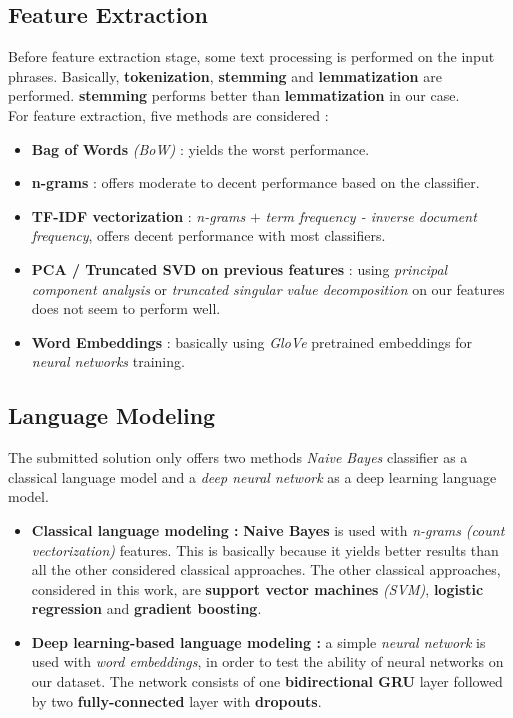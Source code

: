 \documentclass[letterpaper, 10 pt, conference]{ieeeconf}  %
\begin{document}
\subsection{Feature Extraction}
Before feature extraction stage, some text processing is performed on the input phrases. Basically, \textbf{tokenization}, \textbf{stemming} and \textbf{lemmatization} are performed. \textbf{stemming} performs better than \textbf{lemmatization} in our case. \\
For feature extraction, five methods are considered :
\begin{itemize}
    \item \textbf{Bag of Words} \emph{(BoW)} : yields the worst performance.
    \item \textbf{n-grams} : offers moderate to decent performance based on the classifier.
    \item \textbf{TF-IDF vectorization} : \emph{n-grams} $+$ \emph{term frequency - inverse document frequency}, offers decent performance with most classifiers.
    \item \textbf{PCA / Truncated SVD on previous features} : using \emph{principal component analysis} or \emph{truncated singular value decomposition} on our features does not seem to perform well.
    \item \textbf{Word Embeddings} : basically using \emph{GloVe} pretrained embeddings for \emph{neural networks} training.
\end{itemize}

\subsection{Language Modeling}
The submitted solution only offers two methods \emph{Naive Bayes} classifier as a classical language model and a \emph{deep neural network} as a deep learning language model.
\begin{itemize}
    \item \textbf{Classical language modeling :} \textbf{Naive Bayes} is used with \emph{n-grams} \emph{(count vectorization)} features. This is basically because it yields better results than all the other considered classical approaches. The other classical approaches, considered in this work, are \textbf{support vector machines} \emph{(SVM)}, \textbf{logistic regression} and \textbf{gradient boosting}.
    \item \textbf{Deep learning-based language modeling :} a simple \emph{neural network} is used with \emph{word embeddings}, in order to test the ability of neural networks on our dataset. The network consists of one \textbf{bidirectional GRU} layer followed by two \textbf{fully-connected} layer with \textbf{dropouts}. 
\end{itemize}
\end{document}
